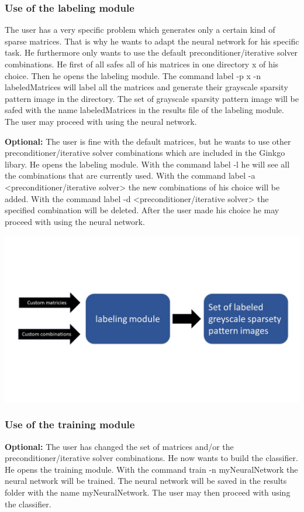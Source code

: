 \documentclass[parskip=full]{scrartcl}
\begin{document}
\subsubsection{Use of the \gls{labeling module}}
The user has a very specific problem which generates only a certain kind of sparse matrices. That is why he wants to adapt the \gls{neural network} for his specific task. He furthermore only wants to use the default \gls{preconditioner}/\gls{iterative solver} combinations. He first of all safes all of his matrices in one directory x of his choice. Then he opens the \gls{labeling module}. The command label -p x -n labeledMatrices will label all the matrices and generate their \gls{grayscale sparsity pattern image} in the directory. The set of \gls{grayscale sparsity pattern image} will be safed with the name labeledMatrices in the results file of the \gls{labeling module}. The user may proceed with using the \gls{neural network}.


\textbf{Optional:} The user is fine with the default matrices, but he wants to use other \gls{preconditioner}/\gls{iterative solver} combinations which are included in the \gls{Ginkgo} libary. He opens the \gls{labeling module}. With the command label -l he will see all the combinations that are currently used. With the command label -a <\gls{preconditioner}/\gls{iterative solver}> the new combinations of his choice will be added. With the command label -d <\gls{preconditioner}/\gls{iterative solver}> the specified combination will be deleted. After the user made his choice he may proceed with using the \gls{neural network}.
\begin{center}
\includegraphics[width=\textwidth]{labelingModule}
\end{center}


\subsubsection{Use of the \gls{training module}}
\textbf{Optional:} The user has changed the set of matrices and/or the \gls{preconditioner}/\gls{iterative solver} combinations. He now wants to build the \gls{classifier}. He opens the \gls{training module}. With the command train -n myNeuralNetwork the \gls{neural network} will be trained. The \gls{neural network} will be saved in the results folder with the name myNeuralNetwork.  The user may then proceed with using the \gls{classifier}.
\end{document}
